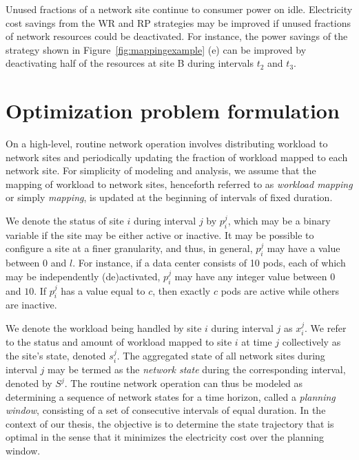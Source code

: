 Unused fractions of a network site continue to consumer power on idle. Electricity cost savings from the WR and RP strategies may be improved if unused fractions of network resources could be deactivated. For instance, the power savings of the strategy shown in Figure~\ref{fig:mappingexample} (e) can be improved by deactivating half of the resources at site B during intervals $t_2$ and $t_3$. 


\section{Optimization problem formulation}
\label{sec:framework:optimization}
On a high-level, routine network operation involves distributing workload to network sites and periodically updating the fraction of workload mapped to each network site. For simplicity of modeling and analysis, we assume that the mapping of workload to network sites, henceforth referred to as \textit{workload mapping} or simply \textit{mapping}, is updated at the beginning of intervals of fixed duration. 

We denote the status of site $i$ during interval $j$ by $p_i^j$, which may be a binary variable if the site may be either active or inactive. It may be possible to configure a site at a finer granularity, and thus, in general, $p_i^j$ may have a value between $0$ and $l$. For instance, if a data center consists of 10 pods, each of which may be independently (de)activated, $p_i^j$ may have any integer value between $0$ and $10$. If $p_i^j$ has a value equal to $c$, then exactly $c$ pods are active while others are inactive. 

We denote the workload being handled by site $i$ during interval $j$ as $x_i^j$. We refer to the status and amount of workload mapped to site $i$ at time $j$ collectively as the site's state, denoted $s_i^j$. The aggregated state of all network sites during interval $j$ may be termed as the \textit{network state} during the corresponding interval, denoted by $S^j$. The routine network operation can thus be modeled as determining a sequence of network states for a time horizon, called a \textit{planning window}, consisting of a set of consecutive intervals of equal duration. In the context of our thesis, the objective is to determine the state trajectory that is optimal in the sense that it minimizes the electricity cost over the planning window. %

